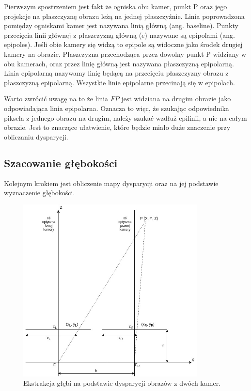 \documentclass[oneside, eng]{mgr}
\begin{document}
Pierwszym spostrzeniem jest fakt że ogniska obu kamer, punkt P oraz jego projekcje na płaszczyznę obrazu leżą na jednej płaszczyźnie. Linia poprowadzona pomiędzy ogniskami kamer jest nazywana linią główną (ang. baseline). 
Punkty przecięcia linii głównej z płaszczyzną główną ($e$) nazywane są epipolami (ang. epipoles). Jeśli obie kamery się widzą to epipole są widoczne jako środek drugiej kamery na obrazie.
Płaszczyzna przechodząca przez dowolny punkt P widziany w obu kamerach, oraz przez linię główną jest nazywana płaszczyzną epipolarną.
Linia epipolarną nazywamy linię będącą na przecięciu płaszczyzny obrazu z płaszczyzną epipolarną. Wszystkie linie epipolarne przecinają się w epipolach.

Warto zwrócić uwagę na to że linia $F P$ jest widziana na drugim obrazie jako odpowiadająca linia epipolarna. Oznacza to więc, że szukając odpowiednika piksela z jednego obrazu na drugim, należy szukać wzdłuż epilinii, a nie na całym obrazie. Jest to znaczące ułatwienie, które będzie miało duże znaczenie przy obliczaniu dysparycji.

\subsection{Szacowanie głębokości}

Kolejnym krokiem jest obliczenie mapy dysparycji oraz na jej podstawie wyznaczenie głębokości. 

\begin{figure}
	\centering
	\includegraphics[width=9.5cm]{ekstrakcja.jpg}
	\caption{Ekstrakcja głębi na podstawie dysparycji obrazów z dwóch kamer. }
	\label{fig:extraction}
\end{figure}
\end{document}
